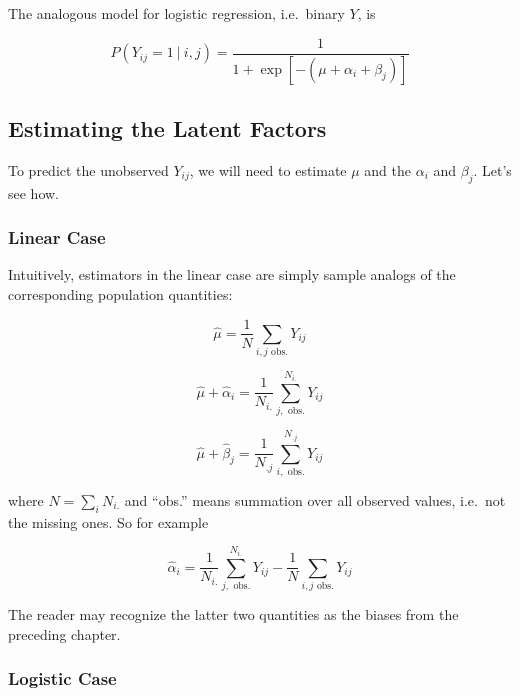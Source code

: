 The analogous model for logistic regression, i.e.\ binary $Y$, is

\begin{equation}
P(Y_{ij} = 1 ~|~ i,j) = 
\frac{1}{1 + \exp[-(\mu + \alpha_i + \beta_j)]}
\end{equation}

\subsection{Estimating the Latent Factors}

To predict the unobserved $Y_{ij}$, we will need to estimate $\mu$ and
the $\alpha_i$ and $\beta_j$.  Let's see how.

\subsubsection{Linear Case}

Intuitively, estimators in the linear case are simply sample analogs of
the corresponding population quantities:

\begin{equation}
\widehat{\mu} = \frac{1}{N} \sum_{i,j \textrm{ obs.}} Y_{ij}
\end{equation}

\begin{equation}
\label{hat.mualphabeta}
\widehat{\mu} + \widehat{\alpha}_i = \frac{1}{N_{i.}}
\sum_{j, \textrm{ obs.}}^{N_{i.}} Y_{ij}
\end{equation}

\begin{equation}
\widehat{\mu} + \widehat{\beta}_j = \frac{1}{N_{.j}}
\sum_{i, \textrm{ obs.}}^{N_{.j}} Y_{ij}
\end{equation}

where $N = \sum_{i} N_{i.}$ and ``obs.'' means summation over all
observed values, i.e.\ not the missing ones.  So for example 

\begin{equation}
\widehat{\alpha}_i = \frac{1}{N_{i.}} 
\sum_{j, \textrm{ obs.}}^{N_{i.}} Y_{ij}
- \frac{1}{N} \sum_{i,j \textrm{ obs.}} Y_{ij}
\end{equation}

The reader may recognize the latter two quantities as the biases from
the preceding chapter.

\subsubsection{Logistic Case}

